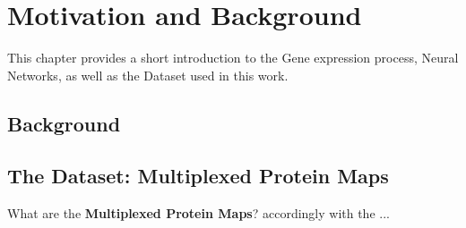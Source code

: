 
\chapter{Motivation and Background}
\label{ch:Motivation_and_Background}

This chapter provides a short introduction to the Gene expression process, Neural Networks, as well as the Dataset used in this work.

\section{Background}
\label{sec:Motivation_and_Background:Background}

\section{The Dataset: Multiplexed Protein Maps}
\label{sec:Motivation_and_Background:Dataset}


 What are the \textbf{Multiplexed Protein Maps}? accordingly with the \cite{Guteaar7042}...
